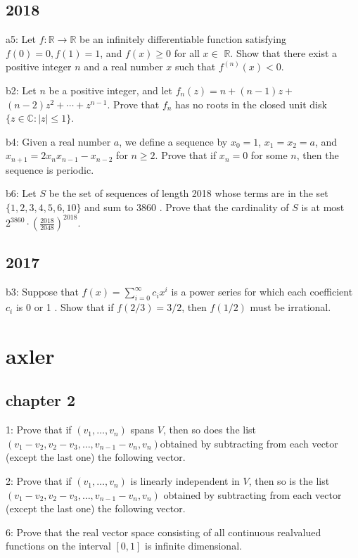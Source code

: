 \documentclass{article}
\begin{document}
\subsection*{2018}
a5: Let $f: \mathbb{R} \rightarrow \mathbb{R}$ be an infinitely differentiable function satisfying $f(0)=0, f(1)=1$, and $f(x) \geq 0$ for all $x \in$ $\mathbb{R}$. Show that there exist a positive integer $n$ and a real number $x$ such that $f^{(n)}(x)<0$.

b2: Let $n$ be a positive integer, and let $f_{n}(z)=n+(n-1) z+$ $(n-2) z^{2}+\cdots+z^{n-1}$. Prove that $f_{n}$ has no roots in the closed unit disk $\{z \in \mathbb{C}:|z| \leq 1\}$.

b4: Given a real number $a$, we define a sequence by $x_{0}=1$, $x_{1}=x_{2}=a$, and $x_{n+1}=2 x_{n} x_{n-1}-x_{n-2}$ for $n \geq 2$. Prove that if $x_{n}=0$ for some $n$, then the sequence is periodic.

b6: Let $S$ be the set of sequences of length 2018 whose terms are in the set $\{1,2,3,4,5,6,10\}$ and sum to 3860 . Prove that the cardinality of $S$ is at most $2^{3860} \cdot\left(\frac{2018}{2048}\right)^{2018} .$

\subsection*{2017}
b3: Suppose that $f(x)=\sum_{i=0}^{\infty} c_{i} x^{i}$ is a power series for which each coefficient $c_{i}$ is 0 or 1 . Show that if $f(2 / 3)=3 / 2$, then $f(1 / 2)$ must be irrational.

\section*{axler}
\subsection*{chapter 2}
1: Prove that if $\left(v_{1}, \ldots, v_{n}\right)$ spans $V$, then so does the list $\left(v_{1}-v_{2}, v_{2}-v_{3}, \ldots, v_{n-1}-v_{n}, v_{n}\right)$obtained by subtracting from each vector (except the last one) the following vector.

2: Prove that if $\left(v_{1}, \ldots, v_{n}\right)$ is linearly independent in $V$, then so is the list $\left(v_{1}-v_{2}, v_{2}-v_{3}, \ldots, v_{n-1}-v_{n}, v_{n}\right)$ obtained by subtracting from each vector (except the last one) the following vector.

6: Prove that the real vector space consisting of all continuous realvalued functions on the interval $[0,1]$ is infinite dimensional.
\end{document}
